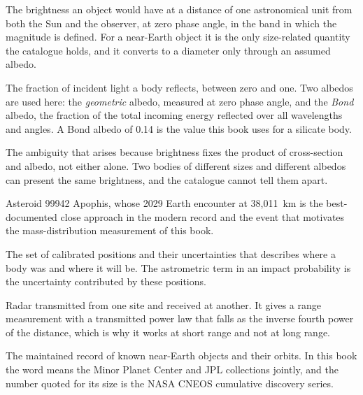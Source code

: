 \begin{description}[style=nextline,leftmargin=1.1em,labelindent=0pt,
  font=\normalfont\ttfamily\color{accent},itemsep=3pt,parsep=0pt]

\item[Absolute magnitude \(H\)] The brightness an object would have at a
distance of one astronomical unit from both the Sun and the observer, at zero
phase angle, in the band in which the magnitude is defined. For a near-Earth
object it is the only size-related quantity the catalogue holds, and it
converts to a diameter only through an assumed albedo.

\item[Albedo] The fraction of incident light a body reflects, between zero
and one. Two albedos are used here: the \emph{geometric} albedo, measured at
zero phase angle, and the \emph{Bond} albedo, the fraction of the total
incoming energy reflected over all wavelengths and angles. A Bond albedo of
0.14 is the value this book uses for a silicate body.

\item[Albedo--diameter degeneracy] The ambiguity that arises because
brightness fixes the product of cross-section and albedo, not either alone.
Two bodies of different sizes and different albedos can present the same
brightness, and the catalogue cannot tell them apart.

\item[Apophis] Asteroid 99942 Apophis, whose 2029 Earth encounter at
38,011~km is the best-documented close approach in the modern record and the
event that motivates the mass-distribution measurement of this book.

\item[Astrometric solution] The set of calibrated positions and their
uncertainties that describes where a body was and where it will be. The
astrometric term in an impact probability is the uncertainty contributed by
these positions.

\item[Bistatic radar] Radar transmitted from one site and received at
another. It gives a range measurement with a transmitted power law that
falls as the inverse fourth power of the distance, which is why it works at
short range and not at long range.

\item[Catalogue] The maintained record of known near-Earth objects and their
orbits. In this book the word means the Minor Planet Center and JPL
collections jointly, and the number quoted for its size is the NASA CNEOS
cumulative discovery series.


\end{description}
